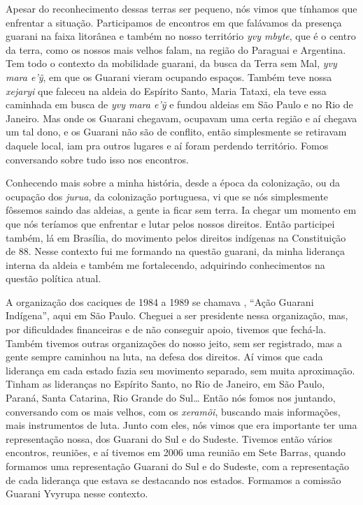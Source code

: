 Apesar do reconhecimento dessas terras ser pequeno, nós vimos que
tínhamos que enfrentar a situação. Participamos de encontros em que
falávamos da presença guarani na faixa litorânea e também no nosso
território \emph{yvy mbyte}, que é o centro da terra, como os nossos mais
velhos falam, na região do Paraguai e Argentina. Tem todo o contexto da
mobilidade guarani, da busca da Terra sem Mal, \emph{yvy mara e’ỹ}, em que
os Guarani vieram ocupando espaços. Também teve nossa \emph{xejaryi} que
faleceu na aldeia do Espírito Santo, Maria Tataxi, ela
teve essa caminhada em busca de \emph{yvy mara e’ỹ} e fundou aldeias em
São Paulo e no Rio de Janeiro. Mas onde os Guarani chegavam, ocupavam
uma certa região e aí chegava um tal dono, e os Guarani não são de
conflito, então simplesmente se retiravam daquele local, iam pra outros
lugares e aí foram perdendo território. Fomos conversando sobre tudo
isso nos encontros.

Conhecendo mais sobre a minha história, desde a época da colonização, ou
da ocupação dos \emph{jurua}, da colonização portuguesa, vi que se nós
simplesmente fôssemos saindo das aldeias, a gente ia ficar sem terra.
Ia chegar um momento em que nós teríamos que enfrentar e lutar pelos
nossos direitos. Então participei também, lá em Brasília, do movimento
pelos direitos indígenas na Constituição de 88. Nesse contexto fui me
formando na questão guarani, da minha liderança interna da aldeia e
também me fortalecendo, adquirindo conhecimentos na questão política
atual.

A organização dos caciques de 1984 a 1989 se chamava , ``Ação
Guarani Indígena'', aqui em São Paulo. Cheguei a ser presidente nessa
organização, mas, por dificuldades financeiras e de não conseguir
apoio, tivemos que fechá-la. Também tivemos outras organizações do
nosso jeito, sem ser registrado, mas a gente sempre caminhou na luta,
na defesa dos direitos. Aí vimos que cada liderança em cada estado
fazia seu movimento separado, sem muita aproximação. Tinham as
lideranças no Espírito Santo, no Rio de Janeiro, em São Paulo, Paraná,
Santa Catarina, Rio Grande do Sul\ldots{} Então nós fomos nos juntando,
conversando com os mais velhos, com os \emph{xeramõi}, buscando mais
informações, mais instrumentos de luta. Junto com eles, nós vimos que
era importante ter uma representação nossa, dos Guarani do Sul e do
Sudeste. Tivemos então vários encontros, reuniões, e aí tivemos em 2006
uma reunião em Sete Barras, quando formamos uma representação Guarani
do Sul e do Sudeste, com a representação de cada liderança que estava
se destacando nos estados. Formamos a comissão Guarani Yvyrupa nesse
contexto. 

